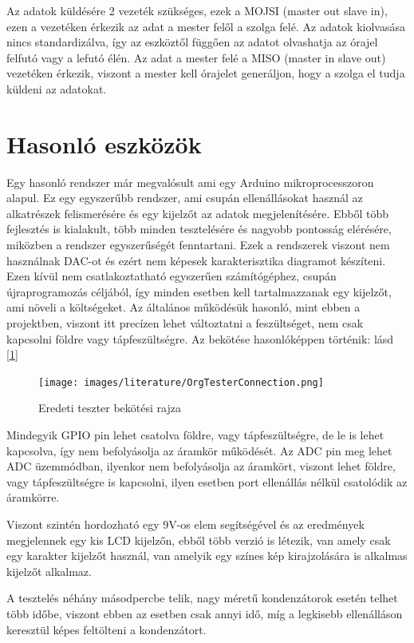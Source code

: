 Az adatok küldésére 2 vezeték szükséges, ezek a MOJSI (master out slave in), ezen a
vezetéken érkezik az adat a mester felől a szolga felé. Az adatok kiolvasása nincs
standardizálva, így az eszköztől függően az adatot olvashatja az órajel felfutó vagy a 
lefutó élén. Az adat a mester felé a MISO (master in slave out) vezetéken érkezik,
viszont a mester kell órajelet generáljon, hogy a szolga el tudja küldeni az adatokat.

\section{Hasonló eszközök}

Egy hasonló rendszer már megvalósult \cite{similarSystem} ami egy Arduino 
\cite{ArduinoAtmega}
mikroprocesszoron alapul. Ez egy egyszerűbb rendszer, ami csupán ellenállásokat használ az 
alkatrészek felismerésére és egy kijelzőt az adatok megjelenítésére. Ebből több fejlesztés is 
kialakult, több minden tesztelésére és nagyobb pontosság elérésére, miközben a rendszer 
egyszerűségét fenntartani. Ezek a rendszerek viszont nem használnak DAC-ot és ezért nem képesek 
karakterisztika diagramot készíteni. Ezen kívül nem csatlakoztatható egyszerűen számítógéphez, 
csupán újraprogramozás céljából, így minden esetben kell tartalmazzanak egy kijelzőt, ami 
növeli a költségeket. Az általános működésük hasonló, mint ebben a projektben, viszont itt 
precízen lehet változtatni a feszültséget, nem csak kapcsolni földre vagy tápfeszültségre.
Az bekötése hasonlóképpen történik: lásd [\ref{fig:basicTesterConnection}]

\begin{figure}[h]
    \centering
    \texttt{[image: images/literature/OrgTesterConnection.png]}
    \caption{Eredeti teszter bekötési rajza}
    \label{fig:basicTesterConnection}
\end{figure}

Mindegyik GPIO pin lehet csatolva földre, vagy tápfeszültségre, de le is lehet kapcsolva, így 
nem befolyásolja az áramkör működését. Az ADC pin meg lehet ADC üzemmódban, ilyenkor nem befolyásolja
az áramkört, viszont lehet földre, vagy tápfeszültségre is kapcsolni, ilyen esetben port ellenállás
nélkül csatolódik az áramkörre.

Viszont szintén hordozható egy 9V-os elem segítségével és az eredmények megjelennek egy
kis LCD kijelzőn, ebből több verzió is létezik, van amely csak egy karakter kijelzőt
használ, van amelyik egy színes kép kirajzolására is alkalmas kijelzőt alkalmaz. 

A tesztelés néhány másodpercbe telik, nagy méretű kondenzátorok esetén telhet több időbe,
viszont ebben az esetben csak annyi idő, míg a legkisebb ellenálláson keresztül képes feltölteni
a kondenzátort.
